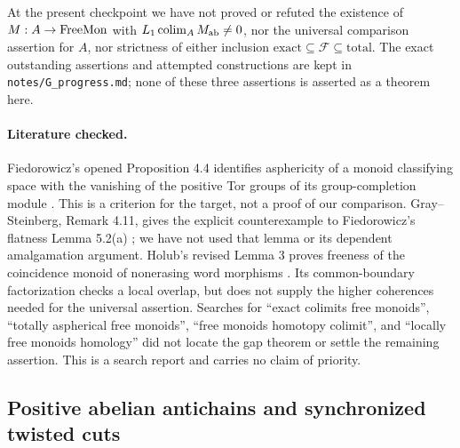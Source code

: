 At the present checkpoint we have not proved or refuted the
existence of $M:A\to\mathrm{FreeMon}$ with
$L_1\operatorname*{colim}_A M_{\mathrm{ab}}\ne0$, nor the universal comparison assertion
for $A$, nor strictness of either inclusion
$\mathrm{exact}\subseteq\mathcal F\subseteq\mathrm{total}$.
The exact outstanding assertions and attempted constructions are
kept in \texttt{notes/G\_progress.md}; none of these three assertions
is asserted as a theorem here.

\paragraph{Literature checked.}
Fiedorowicz's opened Proposition 4.4 identifies asphericity of a
monoid classifying space with the vanishing of the positive Tor
groups of its group-completion module \cite{GFiedorowicz1984}.
This is a criterion for the target, not a proof of our comparison.
Gray--Steinberg, Remark 4.11, gives the explicit counterexample to
Fiedorowicz's flatness Lemma 5.2(a) \cite{GGraySteinberg2024}; we
have not used that lemma or its dependent amalgamation argument.
Holub's revised Lemma 3 proves freeness of the coincidence monoid
of nonerasing word morphisms \cite{GHolub2003}.  Its common-boundary
factorization checks a local overlap, but does not supply the
higher coherences needed for the universal assertion.
Searches for ``exact colimits free monoids'', ``totally aspherical
free monoids'', ``free monoids homotopy colimit'', and ``locally
free monoids homology'' did not locate the gap theorem or settle
the remaining assertion.  This is a search report and carries
no claim of priority.

\subsection{Positive abelian antichains and synchronized twisted cuts}

